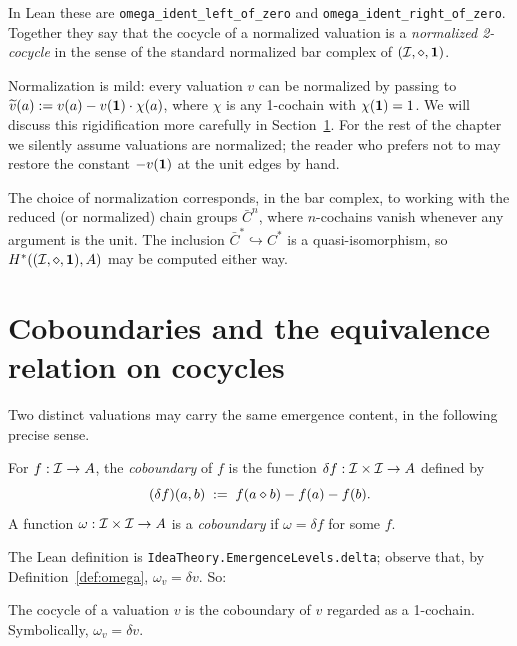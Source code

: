 In Lean these are \texttt{omega\_ident\_left\_of\_zero} and
\texttt{omega\_ident\_right\_of\_zero}. Together they say that the cocycle
of a normalized valuation is a \emph{normalized 2-cocycle} in the sense of
the standard normalized bar complex of $(\mathcal{I},\mathbin{\diamond},\mathbf{1})$.

Normalization is mild: every valuation $v$ can be normalized by passing to
$\widetilde v(a) := v(a) - v(\mathbf{1})\cdot\chi(a)$, where $\chi$ is any
1-cochain with $\chi(\mathbf{1}) = 1$. We will discuss this rigidification more
carefully in Section~\ref{sec:coboundary}. For the rest of the chapter we
silently assume valuations are normalized; the reader who prefers not to may
restore the constant $-v(\mathbf{1})$ at the unit edges by hand.

\begin{remark}
The choice of normalization corresponds, in the bar complex, to working with
the reduced (or normalized) chain groups $\bar C^n$, where $n$-cochains
vanish whenever any argument is the unit. The inclusion $\bar C^* \hookrightarrow
C^*$ is a quasi-isomorphism, so $H^*((\mathcal{I},\mathbin{\diamond},\mathbf{1}), A)$ may be computed either
way.
\end{remark}

\section{Coboundaries and the equivalence relation on cocycles}
\label{sec:coboundary}

Two distinct valuations may carry the same emergence content, in the
following precise sense.

\begin{definition}\label{def:coboundary}
For $f : \mathcal{I} \to A$, the \emph{coboundary} of $f$ is the function
$\delta f : \mathcal{I}\times\mathcal{I} \to A$ defined by
\[
  (\delta f)(a,b) \;:=\; f(a\mathbin{\diamond} b) - f(a) - f(b).
\]
A function $\omega : \mathcal{I}\times\mathcal{I} \to A$ is a \emph{coboundary} if
$\omega = \delta f$ for some $f$.
\end{definition}

The Lean definition is \texttt{IdeaTheory.EmergenceLevels.delta}; observe
that, by Definition~\ref{def:omega}, $\omega_v = \delta v$. So:

\begin{lemma}\label{lem:cob-of-val}
The cocycle of a valuation $v$ is the coboundary of $v$ regarded as a
1-cochain. Symbolically, $\omega_v = \delta v$.
\end{lemma}

